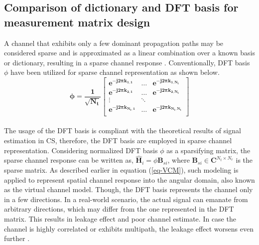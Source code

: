 \subsection{Comparison of dictionary and DFT basis for measurement matrix design}
A channel that exhibits only a few dominant propagation paths may be considered sparse and is approximated as a linear combination over a known basis or dictionary, resulting in a sparse channel response \cite{reviwsparse}.  Conventionally, DFT basis $\phi$ have been utilized for sparse channel representation \cite{reviwsparse,beamblock,dft,mainref-joint,mainref-1bit} as shown below.  
    \[
 \mathbf{    \phi= \frac{1}{\sqrt{N_t}}
    \begin{bmatrix}
e^{-j2\pi k_{1,1}} &\dots& e^{-j2\pi k_{1,N_t}} \\
e^{-j2\pi k_{2,1}} &\dots& e^{-j2\pi k_{2,N_t}} \\
\vdots & \ddots & \\                                          
e^{-j2\pi k_{N_t,1}}  &\dots& e^{-j2\pi k_{N_t,N_t}} \\
    \end{bmatrix}}
    \]    \\
The usage of the DFT basis is compliant with the theoretical results of signal estimation in CS\cite{Candes08}, therefore, the DFT basis are employed in sparse channel representation. Considering normalized DFT basis $\phi$ as a sparsifying matrix, the sparse channel response can be written as, $\mathbf{\hat{H}}_i=\phi \mathbf{B}_{si}$, where $\mathbf{B}_{si} \in \mathbf{C}^{N_t \times N_r}$ is the sparse matrix. As described earlier in equation (\ref{eq-VCM}), such modeling is applied to represent spatial channel response into the angular domain, also known as the virtual channel model. Though, the DFT basis represents the channel only in a few directions. In a real-world scenario, the actual signal can emanate from arbitrary directions, which may differ from the one represented in the DFT matrix. This results in leakage effect and poor channel estimate.  In case the channel is highly correlated or exhibits multipath, the leakage effect worsens even further \cite{Dict_learning}. 


